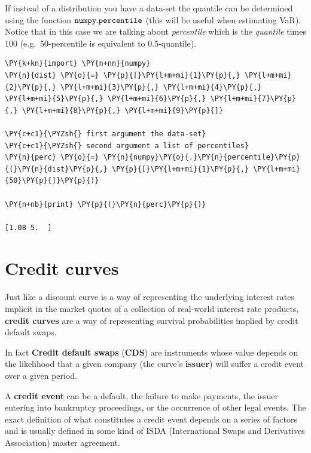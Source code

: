 If instead of a distribution you have a data-set the quantile can be
determined using the function \(\tt{numpy.percentile}\) (this will be
useful when estimating VaR). Notice that in this case we are talking
about \emph{percentile} which is the \emph{quantile} times 100
(e.g.~50-percentile is equivalent to 0.5-quantile).

\begin{tcolorbox}[breakable, size=fbox, boxrule=1pt, pad at break*=1mm,colback=cellbackground, colframe=cellborder]
\begin{Verbatim}[commandchars=\\\{\}]
\PY{k+kn}{import} \PY{n+nn}{numpy}
\PY{n}{dist} \PY{o}{=} \PY{p}{[}\PY{l+m+mi}{1}\PY{p}{,} \PY{l+m+mi}{2}\PY{p}{,} \PY{l+m+mi}{3}\PY{p}{,} \PY{l+m+mi}{4}\PY{p}{,} \PY{l+m+mi}{5}\PY{p}{,} \PY{l+m+mi}{6}\PY{p}{,} \PY{l+m+mi}{7}\PY{p}{,} \PY{l+m+mi}{8}\PY{p}{,} \PY{l+m+mi}{9}\PY{p}{]}
	
\PY{c+c1}{\PYZsh{} first argument the data-set}
\PY{c+c1}{\PYZsh{} second argument a list of percentiles}
\PY{n}{perc} \PY{o}{=} \PY{n}{numpy}\PY{o}{.}\PY{n}{percentile}\PY{p}{(}\PY{n}{dist}\PY{p}{,} \PY{p}{[}\PY{l+m+mi}{1}\PY{p}{,} \PY{l+m+mi}{50}\PY{p}{]}\PY{p}{)}

\PY{n+nb}{print} \PY{p}{(}\PY{n}{perc}\PY{p}{)}
	
[1.08 5.  ]
\end{Verbatim}
\end{tcolorbox}

\section{Credit curves}\label{credit-curves}

Just like a discount curve is a way of representing the underlying
interest rates implicit in the market quotes of a collection of
real-world interest rate products, \textbf{credit curves} are a way of
representing survival probabilities implied by credit default swaps.

In fact \textbf{Credit default swaps} (\textbf{CDS}) are instruments whose value
depends on the likelihood that a given company (the curve's
\textbf{issuer}) will suffer a credit event over a given period.

A \textbf{credit event} can be a default, the failure to make payments,
the issuer entering into bankruptcy proceedings, or the occurrence of
other legal events. The exact definition of what constitutes a credit
event depends on a series of factors and is usually defined in some kind
of ISDA (International Swaps and Derivatives Association) master
agreement.

